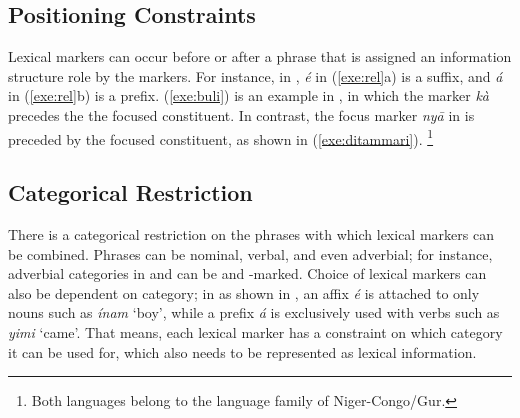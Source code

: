 \subsection{Positioning Constraints}
\label{4:ssec:position}


Lexical markers can occur before or after a phrase that is assigned an
information structure role by the markers. For
instance, in , \textit{{\'e}} in (\ref{exe:rel}a) is a
suffix, and \textit{{\'a}} in (\ref{exe:rel}b) is a prefix.
(\ref{exe:buli}) is an example in , in which the 
marker \textit{k\`{a}} precedes the the focused constituent. In
contrast, the focus marker \textit{ny\={a}} in  is
preceded by the focused constituent, as shown in
(\ref{exe:ditammari}). \footnote{Both languages belong to the language
  family of Niger-Congo/Gur.}







\subsection{Categorical Restriction}
\label{4:ssec:categorical}


There is a categorical restriction on the phrases with which lexical
markers can be combined. Phrases can be nominal, verbal, and even
adverbial; for instance, adverbial categories in  and
 can be \wa and \nun-marked.  Choice of lexical markers
can also be dependent on category; in  as shown in
, an affix \textit{{\'e}} is attached to only nouns
such as \textit{{\'i}nam} `boy', while a prefix \textit{{\'a}} is
exclusively used with verbs such as \textit{yimi} `came'. That means, each lexical marker has a constraint on which
category it can be used for, which also needs to be represented as
lexical information.



